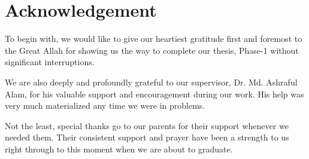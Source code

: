 \section*{Acknowledgement}
To begin with, we would like to give our heartiest gratitude first and foremost to the Great Allah for showing us the way to complete our thesis, Phase-1 without significant interruptions.
\vspace{0.5cm}

We are also deeply and profoundly grateful to our supervisor, Dr. Md. Ashraful Alam, for his valuable support and encouragement during our work. His help was very much materialized any time we were in problems.
\vspace{0.5cm}

Not the least, special thanks go to our parents for their support whenever we needed them. Their consistent support and prayer have been a strength to us right through to this moment when we are about to graduate.